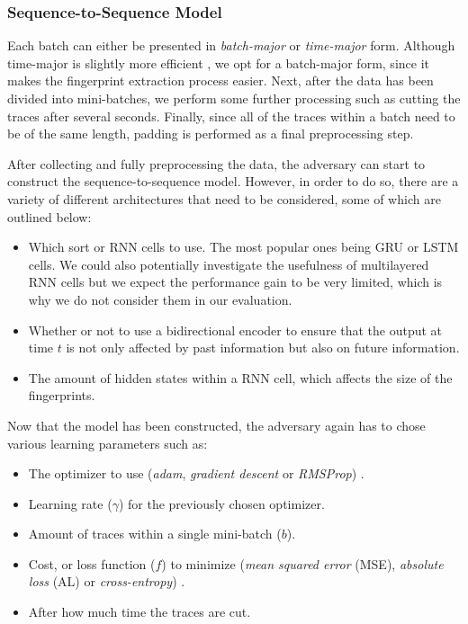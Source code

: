 \subsubsection{Sequence-to-Sequence Model}

Each batch can either be presented in \textit{batch-major} or \textit{time-major} form.
Although time-major is slightly more efficient \cite{tensorflow}, we opt for a batch-major form, since it makes the fingerprint extraction process easier.
Next, after the data has been divided into mini-batches, we perform some further processing such as cutting the traces after several seconds.
Finally, since all of the traces within a batch need to be of the same length, padding is performed as a final preprocessing step.

After collecting and fully preprocessing the data, the adversary can start to construct the sequence-to-sequence model.
However, in order to do so, there are a variety of different architectures that need to be considered, some of which are outlined below:

\begin{itemize}
  \item Which sort or RNN cells to use. The most popular ones being GRU or LSTM cells.
    We could also potentially investigate the usefulness of multilayered RNN cells but we expect the performance gain to be very limited, which is why we do not consider them in our evaluation.

  \item Whether or not to use a bidirectional encoder to ensure that the output at time $t$ is not only affected by past information but also on future information.

  \item The amount of hidden states within a RNN cell, which affects the size of the fingerprints.
\end{itemize}

Now that the model has been constructed, the adversary again has to chose various learning parameters such as:

\newpage

\begin{itemize}
  \item The optimizer to use (\textit{adam}, \textit{gradient descent} or \textit{RMSProp}) \cite{tensorflow}.
  \item Learning rate ($\gamma$) for the previously chosen optimizer.
  \item Amount of traces within a single mini-batch ($b$).
  \item Cost, or loss function ($f$) to minimize (\textit{mean squared error} (MSE), \textit{absolute loss} (AL) or \textit{cross-entropy}) \cite{tensorflow}.
  \item After how much time the traces are cut.
\end{itemize}

